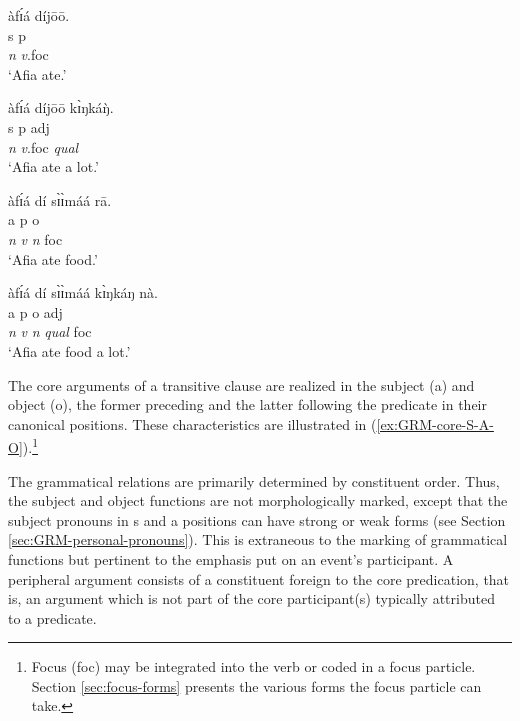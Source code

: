  \ea
\begin{multicols}{2}

\ea\label{ex:GRM-core-S-A-O}{
\glll àfɪ́á díjōō.\\
 {\sc s}  {\sc p}\\
{\it n} {\it v}.{\sc foc}\\
\glt `Afia ate.'
}

\ex\label{ex:GRM-core-S-O}{
\glll àfɪ́á díjōō kɪ̀ŋkáŋ̀.\\
 {\sc s}  {\sc p} {\sc adj}\\
{\it n} {\it v}.{\sc foc}  {\it qual}\\
\glt `Afia ate a lot.'
}


\ex\label{ex:GRM-core-A-O}{
\glll àfɪ́á dí sɪ̀ɪ̀máá rā.\\
 {\sc a}  {\sc p}  {\sc o} {}\\
{\it n} {\it v} {\it n} {\sc foc}\\
\glt `Afia ate food.'
}

\ex\label{ex:GRM-core-A-O}{
\glll àfɪ́á dí sɪ̀ɪ̀máá  kɪ̀ŋkáŋ nà.\\
 {\sc a}  {\sc p}  {\sc o}  {\sc adj}  {}\\
{\it n} {\it v} {\it n}  {\it qual} {\sc foc}\\
\glt `Afia ate food a lot.'
}

\z 
\end{multicols}
 \z


The core arguments of a transitive clause are realized
in the subject ({\sc a}) and object ({\sc o}), the former preceding and the
latter following the predicate in their canonical positions. These
characteristics are illustrated in 
(\ref{ex:GRM-core-S-A-O}).\footnote{Focus ({\sc foc}) may be 
integrated into the verb or coded in a focus particle.  Section 
\ref{sec:focus-forms} presents  the
various forms the focus particle can take.}







The grammatical relations are primarily determined by
constituent order. Thus, the subject and object functions are not
morphologically
marked,  except that the subject pronouns in {\sc s} and {\sc a} positions  can 
have  strong or  weak forms (see Section \ref{sec:GRM-personal-pronouns}). This
is extraneous to the marking of grammatical functions but pertinent to the
emphasis put on  an  event's participant. A peripheral argument  consists of a
constituent foreign to the core predication, that is, an argument which is not
part of the core participant(s) typically attributed to a predicate.  


